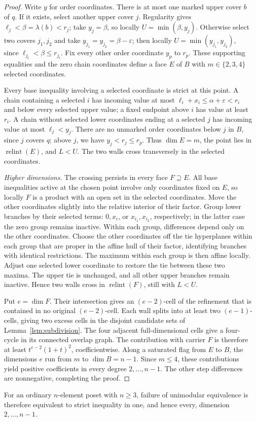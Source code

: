 \documentclass[a4paper,12pt]{amsart}
\theoremstyle{definition}
\theoremstyle{remark}
\newcommand{\relint}{\operatorname{relint}}
\begin{document}
\begin{proof}
Write $y$ for order coordinates.
There is at most one marked upper cover $b$ of $q$.
If it exists, select another upper cover $j$.
Regularity gives $\ell_j<\beta=\lambda(b)<r_j$; take $y_j=\beta$, so locally $U=\min(\beta,y_j)$.
Otherwise select two covers $j_1,j_2$ and take $y_{j_1}=y_{j_2}=\beta-\varepsilon$; then locally $U=\min(y_{j_1},y_{j_2})$, since $\ell_{j_t}<\beta\leq r_{j_t}$.
Fix every other order coordinate $y_p$ to $r_p$.
These supporting equalities and the zero chain coordinates define a face $E$ of $B$ with $m\in\{2,3,4\}$ selected coordinates.

Every base inequality involving a selected coordinate is strict at this point.
A chain containing a selected $i$ has incoming value at most $\ell_i+x_i\leq\alpha+\varepsilon<r_i$ and below every selected upper value; a fixed endpoint above $i$ has value at least $r_i$.
A chain without selected lower coordinates ending at a selected $j$ has incoming value at most $\ell_j<y_j$.
There are no unmarked order coordinates below $j$ in $B$, since $j$ covers $q$; above $j$, we have $y_j<r_j\leq r_p$.
Thus $\dim E=m$, the point lies in $\relint(E)$, and $L<U$.
The two walls cross transversely in the selected coordinates.

\smallskip
\noindent\emph{Higher dimensions.}
The crossing persists in every face $F\supseteq E$.
All base inequalities active at the chosen point involve only coordinates fixed on $E$, so locally $F$ is a product with an open set in the selected coordinates.
Move the other coordinates slightly into the relative interior of their factor.
Group lower branches by their selected terms: $0,x_i$, or $x_{i_1},x_{i_2}$, respectively; in the latter case the zero group remains inactive.
Within each group, differences depend only on the other coordinates.
Choose the other coordinates off the tie hyperplanes within each group that are proper in the affine hull of their factor, identifying branches with identical restrictions.
The maximum within each group is then affine locally.
Adjust one selected lower coordinate to restore the tie between these two maxima.
The upper tie is unchanged, and all other upper branches remain inactive.
Hence two walls cross in $\relint(F)$, still with $L<U$.

Put $e=\dim F$.
Their intersection gives an $(e-2)$-cell of the refinement that is contained in no original $(e-2)$-cell.
Each wall splits into at least two $(e-1)$-cells, giving two excess cells in the disjoint candidate sets of Lemma~\ref{lem:subdivision}.
The four adjacent full-dimensional cells give a four-cycle in its connected overlap graph.
The contribution with carrier $F$ is therefore at least $t^{e-2}(1+t)^2$, coefficientwise.
Along a saturated flag from $E$ to $B$, the dimensions $e$ run from $m$ to $\dim B=n-1$.
Since $m\leq4$, these contributions yield positive coefficients in every degree $2,\ldots,n-1$.
The other step differences are nonnegative, completing the proof.
\end{proof}

For an ordinary $n$-element poset with $n\geq3$, failure of unimodular equivalence is therefore equivalent to strict inequality in one, and hence every, dimension $2,\ldots,n-1$.


\printbibliography
\end{document}
